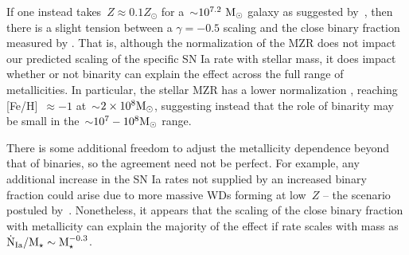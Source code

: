 \documentclass[foo.tex]{subfiles}
\begin{document}
If one instead takes~$Z \approx 0.1Z_\odot$ for a~$\sim$$10^{7.2}~\text{M}_\odot$ galaxy
as suggested by~\citet{Andrews2013}, then there is a slight tension between a
$\gamma = -0.5$ scaling and the close binary fraction measured by
\citet{Moe2019}.
{\color{red}
That is, although the normalization of the MZR does not impact our predicted
scaling of the specific SN Ia rate with stellar mass, it does impact whether or
not binarity can explain the effect across the full range of metallicities.
In particular, the stellar MZR has a lower normalization
\citep[e.g.,][]{Gallazzi2005, Kirby2013, Simon2019}, reaching [Fe/H]~$\approx
-1$ at~$\sim$$2\times10^8 \text{M}_\odot$, suggesting instead that the role of binarity
may be small in the~$\sim$$10^7 - 10^8 \text{M}_\odot$ range.
}


\par
There is some additional freedom to adjust the metallicity dependence beyond
that of binaries, so the agreement need not be perfect.
For example, any additional increase in the SN Ia rates not supplied by an
increased binary fraction could arise due to more massive WDs forming at
low~$Z$ -- the scenario postuled by~\citet{Kistler2013}.
Nonetheless, it appears that the scaling of the close binary fraction with
metallicity can explain the majority of the effect if rate scales with mass as
$\dot{\text{N}}_\text{Ia} / \text{M}_\star \sim \text{M}_\star^{-0.3}$.
\end{document}
